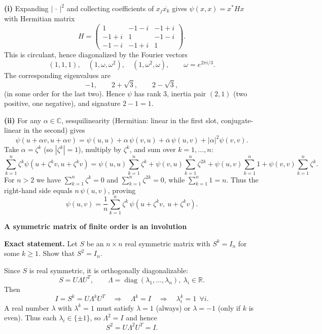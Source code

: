 \begin{solution}
\textbf{(i)} Expanding $|\,\cdot\,|^2$ and collecting coefficients of $x_j\overline{x_k}$ gives $\psi(x,x)=x^*Hx$ with Hermitian matrix
\[
H=\begin{pmatrix}
	1&-1-i&-1+i\\
	-1+i&1&-1-i\\
	-1-i&-1+i&1
\end{pmatrix}.
\]
This is circulant, hence diagonalized by the Fourier vectors
\[
(1,1,1),\quad (1,\omega,\omega^2),\quad (1,\omega^2,\omega),\qquad \omega=e^{2\pi i/3}.
\]
The corresponding eigenvalues are
\[
-1,\qquad 2+\sqrt3,\qquad 2-\sqrt3,
\]
(in some order for the last two). Hence $\psi$ has rank $3$, inertia pair $(2,1)$ (two positive, one negative), and signature $2-1=1$.

\textbf{(ii)} For any $\alpha\in\mathbb C$, sesquilinearity (Hermitian: linear in the first slot, conjugate-linear in the second) gives
\[
\psi(u+\alpha v,u+\alpha v)=\psi(u,u)+\alpha\,\psi(v,u)+\overline{\alpha}\,\psi(u,v)+|\alpha|^2\psi(v,v).
\]
Take $\alpha=\zeta^k$ (so $|\zeta^k|=1$), multiply by $\zeta^k$, and sum over $k=1,\dots,n$:
\[
\sum_{k=1}^n \zeta^k\psi(u+\zeta^k v,u+\zeta^k v)
=
\psi(u,u)\sum_{k=1}^n \zeta^k
+\psi(v,u)\sum_{k=1}^n \zeta^{2k}
+\psi(u,v)\sum_{k=1}^n 1
+\psi(v,v)\sum_{k=1}^n \zeta^k.
\]
For $n>2$ we have $\sum_{k=1}^n\zeta^k=0$ and $\sum_{k=1}^n\zeta^{2k}=0$, while $\sum_{k=1}^n 1=n$.
Thus the right-hand side equals $n\,\psi(u,v)$, proving
\[
\psi(u,v)=\frac1n\sum_{k=1}^n \zeta^k\,\psi(u+\zeta^k v,\ u+\zeta^k v).
\]
\end{solution}

\begin{problem}[CP-I-0058]
\label{prob:cp-i-0058}
\textbf{A symmetric matrix of finite order is an involution}

\textbf{Exact statement.}
\hspace*{1.5em}Let $S$ be an $n\times n$ real symmetric matrix with $S^k=I_n$ for some $k\ge 1$.
Show that $S^2=I_n$.

\end{problem}

\begin{solution}
Since $S$ is real symmetric, it is orthogonally diagonalizable:
\[
S=U\Lambda U^T,\qquad \Lambda=\operatorname{diag}(\lambda_1,\dots,\lambda_n),\ \lambda_i\in\mathbb R.
\]
Then
\[
I=S^k=U\Lambda^kU^T \quad\Rightarrow\quad \Lambda^k=I \quad\Rightarrow\quad \lambda_i^k=1\ \ \forall i.
\]
A real number $\lambda$ with $\lambda^k=1$ must satisfy $\lambda=1$ (always) or $\lambda=-1$ (only if $k$ is even).
Thus each $\lambda_i\in\{\pm 1\}$, so $\Lambda^2=I$ and hence
\[
S^2=U\Lambda^2U^T=I.
\]
\end{solution}

